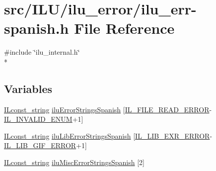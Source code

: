 \hypertarget{ilu__err-spanish_8h}{\section{src/\-I\-L\-U/ilu\-\_\-error/ilu\-\_\-err-\/spanish.h File Reference}
\label{ilu__err-spanish_8h}
}
{\ttfamily \#include \char`\"{}ilu\-\_\-internal.\-h\char`\"{}}\\*
\subsection*{Variables}
\begin{DoxyCompactItemize}
\item 
\hyperlink{il_8h_a103ef32cc870d648d471aff6c7076747}{I\-Lconst\-\_\-string} \hyperlink{ilu__err-spanish_8h_aa0815dfcc69d1112dfb66ca8e8b21e29}{ilu\-Error\-Strings\-Spanish} \mbox{[}\hyperlink{il_8h_ae70fdd3b6e8434371177ed2547b75841}{I\-L\-\_\-\-F\-I\-L\-E\-\_\-\-R\-E\-A\-D\-\_\-\-E\-R\-R\-O\-R}-\/\hyperlink{il_8h_adf311fb99b5d12d7ef3795b0ab3dd918}{I\-L\-\_\-\-I\-N\-V\-A\-L\-I\-D\-\_\-\-E\-N\-U\-M}+1\mbox{]}
\item 
\hyperlink{il_8h_a103ef32cc870d648d471aff6c7076747}{I\-Lconst\-\_\-string} \hyperlink{ilu__err-spanish_8h_afb021075feb8d1a6a5e78e94ad0ef802}{ilu\-Lib\-Error\-Strings\-Spanish} \mbox{[}\hyperlink{il_8h_a4792903188701caaeaa625e49af84a66}{I\-L\-\_\-\-L\-I\-B\-\_\-\-E\-X\-R\-\_\-\-E\-R\-R\-O\-R}-\/\hyperlink{il_8h_ab2d4eb290bfe9e2e5c8d590213034e50}{I\-L\-\_\-\-L\-I\-B\-\_\-\-G\-I\-F\-\_\-\-E\-R\-R\-O\-R}+1\mbox{]}
\item 
\hyperlink{il_8h_a103ef32cc870d648d471aff6c7076747}{I\-Lconst\-\_\-string} \hyperlink{ilu__err-spanish_8h_af06b523dd6eab7d788cff420f7a8c4d0}{ilu\-Misc\-Error\-Strings\-Spanish} \mbox{[}2\mbox{]}
\end{DoxyCompactItemize}


